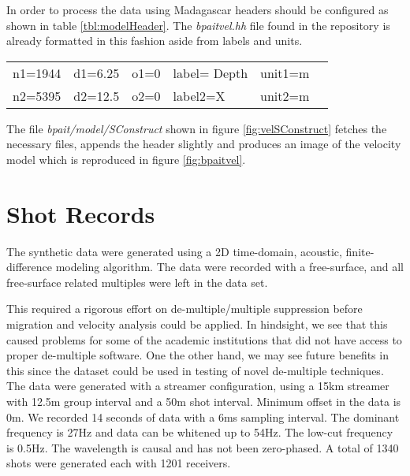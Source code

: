 In order to process the data using Madagascar headers should be configured as shown in table \ref{tbl:modelHeader}.  
The \emph{bpaitvel.hh} file found in the repository is already formatted in this fashion aside from labels and units.    

{
\begin{tabular}{|llllll|}
        \hline
    n1=1944    &     d1=6.25   &        o1=0  &        label= Depth & unit1=m &  \\
    n2=5395   &     d2=12.5   &        o2=0  &        label2=X     & unit2=m &  \\
        \hline
\end{tabular}
}

The file \emph{bpait/model/SConstruct} shown in figure \ref{fig:velSConstruct} fetches the necessary files, 
appends the header slightly and produces an image of the velocity model which is reproduced in figure \ref{fig:bpaitvel}.

{
\tiny

\normalsize
}



\section{Shot Records}
The synthetic data were generated using a 2D time-domain, acoustic, finite-difference
modeling algorithm. The data were recorded with a free-surface, and all free-surface 
related multiples were left in the data set.

This required a rigorous effort on de-multiple/multiple suppression
before migration and velocity analysis could be applied. In hindsight, we see that this caused
problems for some of the academic institutions that did not have access to proper de-multiple
software. One the other hand, we may see future benefits in this since the dataset could be
used in testing of novel de-multiple techniques.
The data were generated with a streamer configuration, using a 15km streamer with 12.5m
group interval and a 50m shot interval. Minimum offset in the data is 0m. We recorded 14
seconds of data with a 6ms sampling interval. The dominant frequency is 27Hz and data can
be whitened up to 54Hz. The low-cut frequency is 0.5Hz. The wavelength is causal and has
not been zero-phased. A total of 1340 shots were generated each with 1201 receivers.

